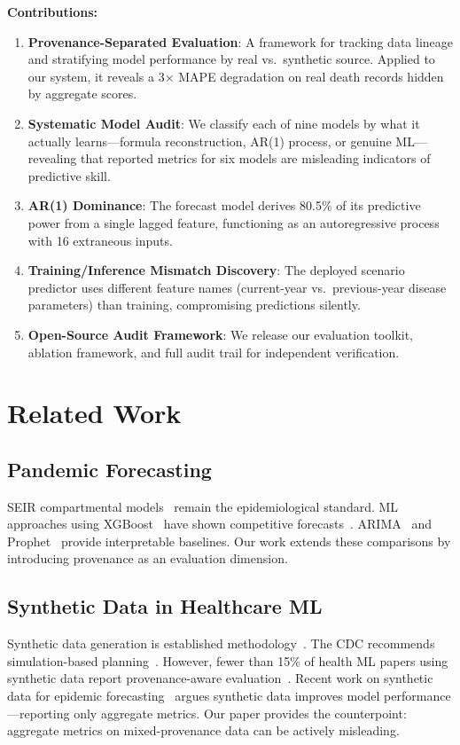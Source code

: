 \documentclass{ieeeaccess}
\begin{document}
\textbf{Contributions:}
\begin{enumerate}
    \item \textbf{Provenance-Separated Evaluation}: A framework for tracking data lineage and stratifying model performance by real vs.\ synthetic source. Applied to our system, it reveals a 3$\times$ MAPE degradation on real death records hidden by aggregate scores.
    \item \textbf{Systematic Model Audit}: We classify each of nine models by what it actually learns---formula reconstruction, AR(1) process, or genuine ML---revealing that reported metrics for six models are misleading indicators of predictive skill.
    \item \textbf{AR(1) Dominance}: The forecast model derives 80.5\% of its predictive power from a single lagged feature, functioning as an autoregressive process with 16 extraneous inputs.
    \item \textbf{Training/Inference Mismatch Discovery}: The deployed scenario predictor uses different feature names (current-year vs.\ previous-year disease parameters) than training, compromising predictions silently.
    \item \textbf{Open-Source Audit Framework}: We release our evaluation toolkit, ablation framework, and full audit trail for independent verification.
\end{enumerate}

\section{Related Work}
\label{sec:related}

\subsection{Pandemic Forecasting}
SEIR compartmental models~\cite{kermack1927} remain the epidemiological standard. ML approaches using XGBoost~\cite{chen2016} have shown competitive forecasts~\cite{wang2020,yan2023}. ARIMA~\cite{box2015} and Prophet~\cite{taylor2018} provide interpretable baselines. Our work extends these comparisons by introducing provenance as an evaluation dimension.

\subsection{Synthetic Data in Healthcare ML}
Synthetic data generation is established methodology~\cite{reich2022,gonzales2023}. The CDC recommends simulation-based planning~\cite{cdc2019}. However, fewer than 15\% of health ML papers using synthetic data report provenance-aware evaluation~\cite{chen2023}. Recent work on synthetic data for epidemic forecasting~\cite{marchi2026} argues synthetic data improves model performance---reporting only aggregate metrics. Our paper provides the counterpoint: aggregate metrics on mixed-provenance data can be actively misleading.
\end{document}
